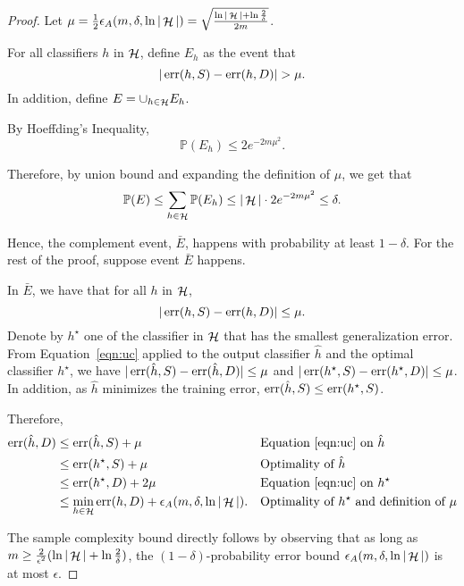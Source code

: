\documentclass{article}
\DeclareMathOperator*{\err}{{\rm err}}
\DeclareMathOperator*{\Hcal}{{\cal H}}
\newcommand{\PP}{\mathbb{P}}
\begin{document}
\begin{proof}
Let $\mu = \frac{1}{2}\epsilon_A(m,\delta,\ln|\Hcal|) = \sqrt{\frac{\ln|\Hcal| + \ln\frac{2}{\delta}}{2m}}$.

For all classifiers $h$ in $\Hcal$, define $E_h$ as the event that
\[ |\err(h, S) - \err(h, D)| > \mu. \]
In addition, define $E = \cup_{h \in \Hcal} E_h$.

By Hoeffding's Inequality,
\[ \PP(E_h) \leq 2 e^{-2 m \mu^2}. \]

Therefore, by union bound and expanding the definition of $\mu$, we get that
\[ \PP(E) \leq \sum_{h \in \Hcal} \PP(E_h) \leq |\Hcal| \cdot 2 e^{-2 m \mu^2} \leq \delta. \]

Hence, the complement event, $\bar{E}$, happens with probability at least $1-\delta$. For the rest of the proof, suppose event $\bar{E}$ happens.

In $\bar{E}$, we have that for all $h$ in $\Hcal$,
\begin{equation}
  |\err(h, S) - \err(h, D)| \leq \mu.
  \label{eqn:uc}
\end{equation}
Denote by $h^\star$ one of the classifier in $\Hcal$ that has the smallest generalization error. From Equation~\ref{eqn:uc} applied to the output classifier $\hat{h}$ and the optimal classifier $h^\star$, we have
$|\err(\hat{h}, S) - \err(\hat{h}, D)| \leq \mu$ and $|\err(h^\star, S) - \err(h^\star, D)| \leq \mu$.
In addition, as $\hat{h}$ minimizes the training error, $\err(\hat{h}, S) \leq \err(h^\star, S)$.

Therefore,
\begin{align*}
  \err(\hat{h}, D)
  &\leq \err(\hat{h}, S) + \mu && \text{Equation~\eqref{eqn:uc} on $\hat{h}$} \\
  &\leq \err(h^\star, S) + \mu && \text{Optimality of $\hat{h}$}\\
  &\leq \err(h^\star, D) + 2 \mu && \text{Equation~\eqref{eqn:uc} on $h^\star$}\\
  &\leq \min_{h \in \Hcal} \err(h, D) + \epsilon_A(m,\delta,\ln|\Hcal|). && \text{Optimality of $h^\star$ and definition of $\mu$}
\end{align*}

The sample complexity bound directly follows by observing that as long as $m \geq \frac{2}{\epsilon^2}(\ln|\Hcal| + \ln\frac{2}{\delta})$,
the $(1-\delta)$-probability error bound $\epsilon_A(m, \delta, \ln|\Hcal|)$ is at most $\epsilon$.
\end{proof}




\end{document}

